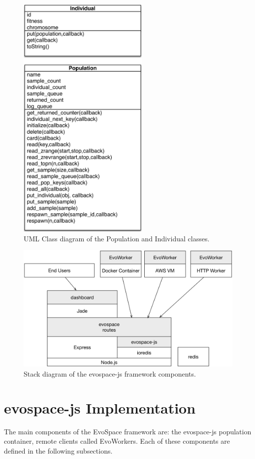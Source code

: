 \begin{figure}[!t]
    \centering
        \includegraphics[width=2.5in]{img/classes.png}
    \caption{ UML Class diagram of the Population and Individual classes.}
    \label{fig:classes}
\end{figure}
%
\begin{figure}[!t]
    \centering
        \includegraphics[width=5.4in]{img/evospace-js.png}
    \caption{ Stack diagram of the {\sf evospace-js} framework components.}
    \label{fig:stack}
\end{figure}

\section{{\sf evospace-js} Implementation}
\label{sec:evo}
The main components of the EvoSpace framework are: the {\sf evospace-js} 
population container, remote clients called EvoWorkers.
Each of these components are defined in the following subsections.

